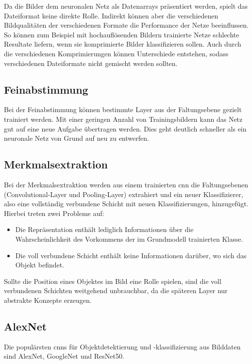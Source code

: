 Da die Bilder dem neuronalen Netz als Datenarrays präsentiert werden, spielt das Dateiformat keine direkte Rolle. 
Indirekt können aber die verschiedenen Bildqualitäten der verschiedenen Formate die Performance der Netze beeinflussen. 
So können zum Beispiel mit hochauflösenden Bildern trainierte Netze schlechte Resultate liefern, wenn sie komprimierte Bilder 
klassifizieren sollen. \cite{Dodge:2016}Auch durch die verschiedenen Komprimierungen können Unterschiede entstehen,
 sodass verschiedenen Dateiformate nicht gemischt werden sollten.

\subsection{Feinabstimmung}

	Bei der Feinabstimmung können bestimmte Layer aus der Faltungsebene gezielt trainiert
	werden. Mit einer geringen Anzahl von Trainingsbildern kann das Netz gut auf eine neue
	Aufgabe übertragen werden. Dies geht deutlich schneller als ein neuronale Netz von Grund
	auf neu zu entwerfen. \cite{Chollet:2018}		

\subsection{Merkmalsextraktion}

Bei der Merkmalsextraktion werden aus einem trainierten \ac{cnn} die Faltungsebenen (Convolutional-Layer und Pooling-Layer) 
extrahiert und ein neuer Klassifizierer, also eine vollständig verbundene Schicht mit neuen Klassifizierungen, hinzugefügt. 
Hierbei treten zwei Probleme auf:

\begin{itemize}
	\item Die Repräsentation enthält lediglich Informationen über die Wahrscheinlichkeit des
	Vorkommens der im Grundmodell trainierten Klasse.
	\item  Die voll verbundene Schicht enthält keine Informationen darüber, wo sich das Objekt
	befindet.
\end{itemize}
	
	Sollte die Position eines Objektes im Bild eine Rolle spielen, sind die voll verbundenen
	Schichten weitgehend unbrauchbar, da die späteren Layer nur abstrakte Konzepte erzeugen. \cite{Chollet:2018}

\subsection{AlexNet}
Die populärsten \ac{cnn}s für Objektdetektierung und -klassifizierung aus Bilddaten sind AlexNet, GoogleNet und ResNet50. \cite{Sharma:2018}

